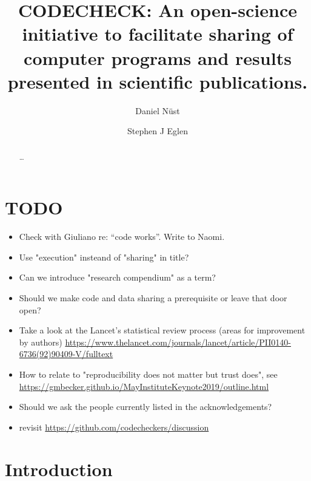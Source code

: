\documentclass[12pt]{article}
\begin{document}
\title{CODECHECK: An open-science initiative to facilitate sharing of
  computer programs and results presented in scientific publications.}
\author[1,$\ast$]{Daniel N\"{u}st}
\author[2,$\ast$]{Stephen J Eglen}
\maketitle
\begin{abstract}
\ldots{}
\end{abstract}

\section*{TODO}\label{todo}

\begin{itemize}
\item Check with Giuliano re: ``code works''. Write to Naomi.
\item Use "execution" insteand of "sharing" in title?
\item Can we introduce "research compendium" as a term?
\item Should we make code and data sharing a prerequisite or leave that door open?
\item Take a look at the Lancet's statistical review process (areas for improvement by authors) \url{https://www.thelancet.com/journals/lancet/article/PII0140-6736(92)90409-V/fulltext}
\item How to relate to "reproducibility does not matter but trust does", see \url{https://gmbecker.github.io/MayInstituteKeynote2019/outline.html}
\item Should we ask the people currently listed in the acknowledgements?
\item revisit \url{https://github.com/codecheckers/discussion}
\end{itemize}

\section*{Introduction}\label{introduction}
\end{document}

